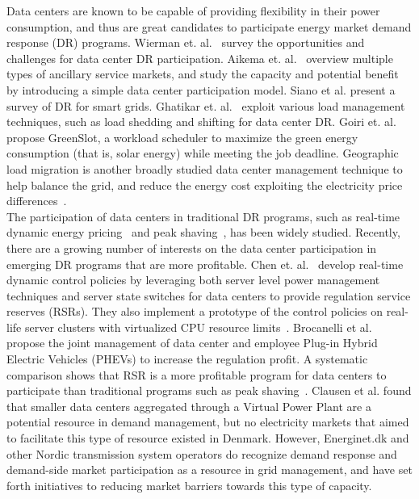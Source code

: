 Data centers are known to be capable of providing flexibility in their power consumption, and thus are great candidates to participate energy market demand response (DR) programs. Wierman et. al.~\cite{WiermanIGCC} survey the opportunities and challenges for data center DR participation. Aikema et. al.~\cite{aikema2012data} overview multiple types of ancillary service markets, and study the capacity and potential benefit by introducing a simple data center participation model. Siano et al. \cite{siano2014demand} present a survey of DR for smart grids. Ghatikar et. al.~\cite{ghatikar2012demand} exploit various load management techniques, such as load shedding and shifting for data center DR. Goiri et. al.~\cite{goiri2015matching} propose GreenSlot, a workload scheduler to maximize the green energy consumption (that is, solar energy) while meeting the job deadline. Geographic load migration is another broadly studied data center management technique to help balance the grid, and reduce the energy cost exploiting the electricity price differences~\cite{wangexploring,wang2013data,chiu2012electric,liu2011greening,lin2012online}. \\

The participation of data centers in traditional DR programs, such as real-time dynamic energy pricing~\cite{wang2013sequential,ghamkhari2012data,liu2014pricing} and peak shaving~\cite{urgaonkar2011optimal,PSUSigmetrics12,aksanli2013architecting}, has been widely studied. Recently, there are a growing number of interests on the data center participation in emerging DR programs that are more profitable. Chen et. al.~\cite{chenASPDAC} develop real-time dynamic control policies by leveraging both server level power management techniques and server state switches for data centers to provide regulation service reserves (RSRs). They also implement a prototype of the control policies on real-life server clusters with virtualized CPU resource limits~\cite{chendynamic}. Brocanelli et al.~\cite{brocanelli2013joint} propose the joint management of data center and employee Plug-in Hybrid Electric Vehicles (PHEVs) to increase the regulation profit. A systematic comparison shows that RSR is a more profitable program for data centers to participate than traditional programs such as peak shaving~\cite{chenIGCC}. Clausen et al. \cite{clausen2014load} found that smaller data centers aggregated through a Virtual Power Plant are a potential resource in demand management, but no electricity markets that aimed to facilitate this type of resource existed in Denmark. However, Energinet.dk and other Nordic transmission system operators do recognize demand response and demand-side market participation as a resource in grid management, and have set forth initiatives to reducing market barriers towards this type of capacity.